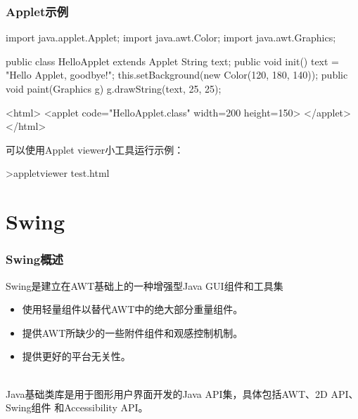 \begin{frame}[fragile] 
  \frametitle{Applet示例}

  
  \begin{javaCode}
    import java.applet.Applet;
    import java.awt.Color;
    import java.awt.Graphics;

    public class HelloApplet extends Applet {
      String text;
      public void init() {
        text = "Hello Applet, goodbye!";
        this.setBackground(new Color(120, 180, 140));
      }
      public void paint(Graphics g) {
        g.drawString(text, 25, 25);
      }
    }
  \end{javaCode}

  
  \begin{shCode}
    <html>
    <applet code="HelloApplet.class" width=200 height=150> </applet>
    </html>  
  \end{shCode}

  可以使用Applet viewer小工具运行示例：
  
  \begin{shCode}
    >appletviewer test.html
  \end{shCode}
\end{frame}

\section{Swing}

\begin{frame}[fragile] %
  \frametitle{Swing概述}


  Swing是建立在AWT基础上的一种增强型Java GUI组件和工具集
  \begin{itemize}\kai
  \item 使用轻量组件以替代AWT中的绝大部分重量组件。
  \item 提供AWT所缺少的一些附件组件和观感控制机制。
  \item 提供更好的平台无关性。
  \end{itemize}

  \\
  Java基础类库是用于图形用户界面开发的Java API集，具体包括AWT、2D API、Swing组件
  和Accessibility API。
\end{frame}

